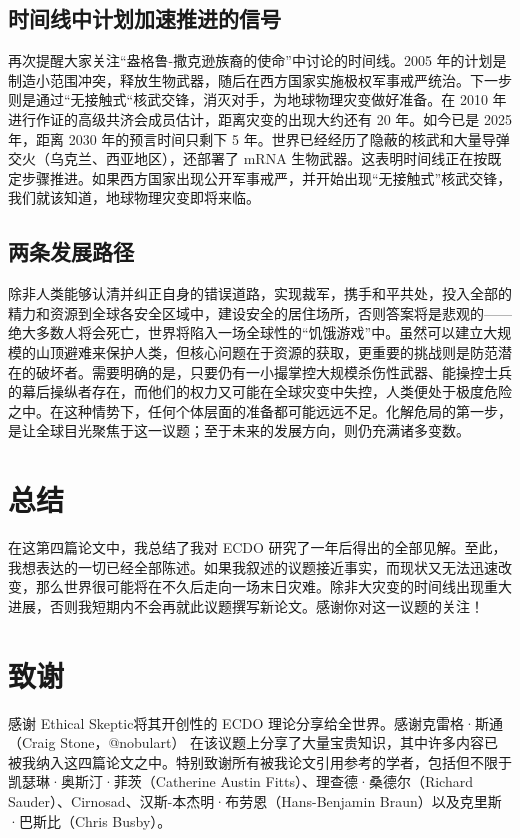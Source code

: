\documentclass[10pt,twocolumn,letterpaper]{article}
\begin{document}
\subsection{时间线中计划加速推进的信号}

再次提醒大家关注“盎格鲁-撒克逊族裔的使命”中讨论的时间线。2005 年的计划是制造小范围冲突，释放生物武器，随后在西方国家实施极权军事戒严统治。下一步则是通过“无接触式“核武交锋，消灭对手，为地球物理灾变做好准备。在 2010 年进行作证的高级共济会成员估计，距离灾变的出现大约还有 20 年。如今已是 2025 年，距离 2030 年的预言时间只剩下 5 年。世界已经经历了隐蔽的核武和大量导弹交火（乌克兰、西亚地区），还部署了 mRNA 生物武器。这表明时间线正在按既定步骤推进。如果西方国家出现公开军事戒严，并开始出现“无接触式”核武交锋，我们就该知道，地球物理灾变即将来临。

\subsection{两条发展路径}

除非人类能够认清并纠正自身的错误道路，实现裁军，携手和平共处，投入全部的精力和资源到全球各安全区域中，建设安全的居住场所，否则答案将是悲观的——绝大多数人将会死亡，世界将陷入一场全球性的“饥饿游戏”中。虽然可以建立大规模的山顶避难来保护人类，但核心问题在于资源的获取，更重要的挑战则是防范潜在的破坏者。需要明确的是，只要仍有一小撮掌控大规模杀伤性武器、能操控士兵的幕后操纵者存在，而他们的权力又可能在全球灾变中失控，人类便处于极度危险之中。在这种情势下，任何个体层面的准备都可能远远不足。化解危局的第一步，是让全球目光聚焦于这一议题；至于未来的发展方向，则仍充满诸多变数。
\section{总结}

在这第四篇论文中，我总结了我对 ECDO 研究了一年后得出的全部见解。至此，我想表达的一切已经全部陈述。如果我叙述的议题接近事实，而现状又无法迅速改变，那么世界很可能将在不久后走向一场末日灾难。除非大灾变的时间线出现重大进展，否则我短期内不会再就此议题撰写新论文。感谢你对这一议题的关注！

\section{致谢}
感谢 Ethical Skeptic\cite{0}将其开创性的 ECDO 理论分享给全世界。感谢克雷格·斯通（Craig Stone，@nobulart）\cite{56} 在该议题上分享了大量宝贵知识，其中许多内容已被我纳入这四篇论文之中。特别致谢所有被我论文引用参考的学者，包括但不限于凯瑟琳·奥斯汀·菲茨（Catherine Austin Fitts）\cite{55}、理查德·桑德尔（Richard Sauder）、Cirnosad\cite{24}、汉斯-本杰明·布劳恩（Hans-Benjamin Braun）\cite{57}以及克里斯·巴斯比（Chris Busby）。
\end{document}
